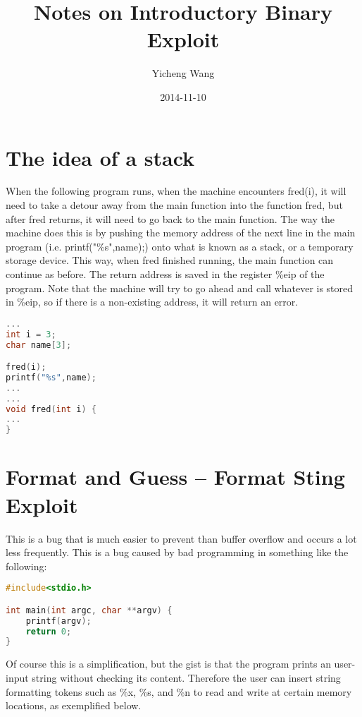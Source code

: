 \documentclass [12 pt, twoside] {article}
\begin{document}
\title{Notes on Introductory Binary Exploit}
\author{Yicheng Wang}
\date{2014-11-10}
\maketitle

\section{The idea of a stack}

When the following program runs, when the machine encounters fred(i), it will need to take a detour
away from the main function into the function fred, but after fred returns, it will need to go back
to the main function. The way the machine does this is by pushing the memory address of the next line
in the main program (i.e. printf("\%s",name);) onto what is known as a stack, or a temporary storage
device. This way, when fred finished running, the main function can continue as before. The return
address is saved in the register \%eip of the program. Note that the machine will try to go ahead and call
whatever is stored in \%eip, so if there is a non-existing address, it will return an error.

\begin{lstlisting}[language=C++]
...
int i = 3;
char name[3];

fred(i);
printf("%s",name);
...
...
void fred(int i) {
...
}
\end{lstlisting}


\section{Format and Guess -- Format Sting Exploit}


This is a bug that is much easier to prevent than buffer overflow and occurs a lot less frequently.
This is a bug caused by bad programming in something like the following:
\begin{lstlisting}[language=C++]
#include<stdio.h>

int main(int argc, char **argv) {
	printf(argv);
	return 0;
}
\end{lstlisting}


Of course this is a simplification, but the gist is that the program prints an user-input string
without checking its content. Therefore the user can insert string formatting tokens such as \%x,
\%s, and \%n to read and write at certain memory locations, as exemplified below.
\end{document}
